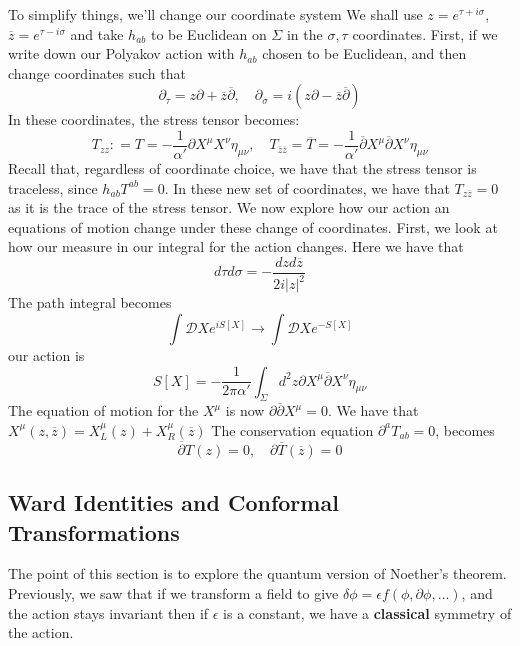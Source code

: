 \documentclass[11pt, oneside]{article}   	%
\theoremstyle{slanted}
\begin{document}
To simplify things, we'll change our coordinate system 
We shall use $ z  = e ^{ \tau  +i \sigma }  $, $ \overline{ z }  = 
e ^{ \tau  - i \sigma } $ and take $ h _{ ab } $
to be Euclidean on $ \Sigma $ in the 
$ \sigma, \tau $ coordinates. First, if we
 write down our Polyakov action 
 with $ h _{ab  } $ chosen to be Euclidean, 
 and then change coordinates such that 
 \[
  \partial  _ \tau  = z \partial  + \overline{ z } \overline{ \partial   }, 
  \quad \partial  _ \sigma  = i \left( z \partial  
   - \overline{ z} \overline{ \partial  } \right) 
 \] In these coordinates, 
the stress tensor becomes: 
\[
 T_{ z z} :  = T  = - \frac{1}{\alpha ' } \partial X ^ \mu X ^ \nu \eta _{ \mu \nu } , 
 \quad T _{ \overline{ z } \overline{ z } }  = \overline{ T }  = 
  - \frac{1}{\alpha ' } \overline{ \partial   } X ^ \mu \overline{ \partial  } 
  X ^ \nu \eta _{ \mu \nu } 
\] 
Recall that, 
regardless of coordinate choice, 
we have that the stress tensor 
is traceless, since $ h _{ ab } T ^{ 
ab }  = 0 $. In these new set 
of coordinates, we have that $ T _{ z \overline{ z } }  = 0 $ as it is the trace 
of the stress tensor. 
We now explore how 
our action an equations of motion 
change under these change of coordinates. 
First, we look at how our measure 
in our integral for the action changes. 
Here we have that 
\[
 d \tau d \sigma  = - \frac{d z d \overline{ z } }{ 2 i | z | ^ 2 }
\] The path integral becomes 
\[
 \int \mathcal{ D } X e ^{ i S \left[  X  \right]  } \to 
 \int \mathcal{ D } X e ^{  - S\left[  X  \right]  } 
\]  our action is 
\[
 S \left[  X  \right]   = - \frac{1}{2 \pi \alpha ' } 
 \int _{ \Sigma } d ^ 2 z \partial  X ^ \mu 
 \overline{ \partial  } X ^ \nu \eta _{ \mu \nu }
\] The equation of motion for the $ X ^ \mu $ is 
now $ \partial  \overline{ \partial } X ^ \mu  = 0  $. 
We have that $ X ^ \mu \left( z, \overline{ z }  \right)   = 
X _ L ^ \mu \left(  z   \right)  + X _ R ^{ \mu } \left( \overline{ z }  \right)  $
The conservation equation $ \partial  ^ a T _{ ab }  =0 $, 
becomes 
\[
	\overline{ \partial   } T \left( z  \right)   =0 , \quad 
	\partial  \overline{ T } \left( \overline{ z }  \right)   = 0 
\] 
\subsection{Ward Identities and Conformal Transformations}
The point of this section is 
to explore the quantum version of Noether's 
theorem. 
Previously, we saw that 
if we transform a field to give $ \delta \phi   = 
\epsilon   f \left(  \phi , \partial  \phi , \dots  \right)  $, 
and the action stays invariant 
then if $ \epsilon $ is a constant, we have a 
\textbf{classical} symmetry of the action.
\end{document}
